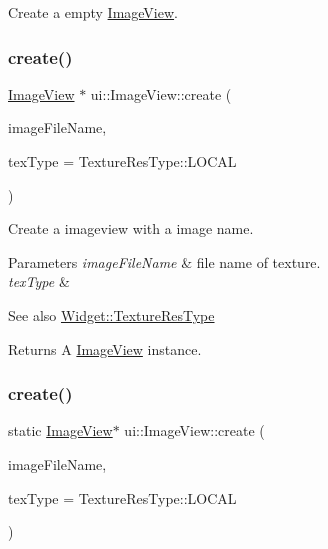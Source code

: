 Create a empty \hyperlink{classui_1_1ImageView}{Image\+View}. \mbox{\label{classui_1_1ImageView_a23ce1799f9fd1f2346ac96f32764f639}} 
\subsubsection{\texorpdfstring{create()}{create()}\hspace{0.1cm}{\footnotesize\ttfamily [3/4]}}
{\footnotesize\ttfamily \hyperlink{classui_1_1ImageView}{Image\+View} $\ast$ ui\+::\+Image\+View\+::create (\begin{DoxyParamCaption}\item[{const std\+::string \&}]{image\+File\+Name,  }\item[{\hyperlink{classui_1_1Widget_a040a65ec5ad3b11119b7e16b98bd9af0}{Texture\+Res\+Type}}]{tex\+Type = {\ttfamily TextureResType\+:\+:LOCAL} }\end{DoxyParamCaption})\hspace{0.3cm}{\ttfamily [static]}}

Create a imageview with a image name.


\begin{DoxyParams}{Parameters}
{\em image\+File\+Name} & file name of texture. \\
\hline
{\em tex\+Type} & \\
\hline
\end{DoxyParams}
\begin{DoxySeeAlso}{See also}
{\ttfamily \hyperlink{classui_1_1Widget_a040a65ec5ad3b11119b7e16b98bd9af0}{Widget\+::\+Texture\+Res\+Type}} 
\end{DoxySeeAlso}
\begin{DoxyReturn}{Returns}
A \hyperlink{classui_1_1ImageView}{Image\+View} instance. 
\end{DoxyReturn}
\mbox{\label{classui_1_1ImageView_ae59e0212595985a4c0304020144e0c24}} 
\subsubsection{\texorpdfstring{create()}{create()}\hspace{0.1cm}{\footnotesize\ttfamily [4/4]}}
{\footnotesize\ttfamily static \hyperlink{classui_1_1ImageView}{Image\+View}$\ast$ ui\+::\+Image\+View\+::create (\begin{DoxyParamCaption}\item[{const std\+::string \&}]{image\+File\+Name,  }\item[{\hyperlink{classui_1_1Widget_a040a65ec5ad3b11119b7e16b98bd9af0}{Texture\+Res\+Type}}]{tex\+Type = {\ttfamily TextureResType\+:\+:LOCAL} }\end{DoxyParamCaption})\hspace{0.3cm}{\ttfamily [static]}}

